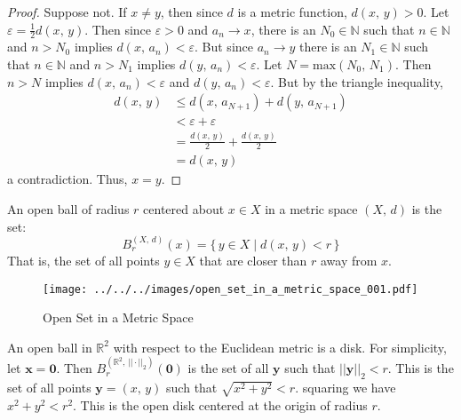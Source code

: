 \documentclass{article}
\theoremstyle{plain}
\theoremstyle{normal}
\newenvironment{example}{%
    \pushQED{\qed}\renewcommand{\qedsymbol}{$\blacksquare$}\examplex%
}{%
    \popQED\endexamplex%
}
\newenvironment{definition}{%
    \pushQED{\qed}\renewcommand{\qedsymbol}{$\blacksquare$}\definitionx%
}{%
    \popQED\enddefinitionx%
}
\begin{document}
        \begin{proof}
            Suppose not. If $x\ne{y}$, then since $d$ is a metric function,
            $d(x,\,y)>0$. Let $\varepsilon=\frac{1}{2}d(x,\,y)$. Then since
            $\varepsilon>0$ and $a_{n}\rightarrow{x}$, there is an
            $N_{0}\in\mathbb{N}$ such that $n\in\mathbb{N}$ and $n>N_{0}$
            implies $d(x,\,a_{n})<\varepsilon$. But since $a_{n}\rightarrow{y}$
            there is an $N_{1}\in\mathbb{N}$ such that $n\in\mathbb{N}$ and
            $n>N_{1}$ implies $d(y,\,a_{n})<\varepsilon$. Let
            $N=\textrm{max}(N_{0},\,N_{1})$. Then $n>N$ implies
            $d(x,\,a_{n})<\varepsilon$ and $d(y,\,a_{n})<\varepsilon$. But by
            the triangle inequality,
            \begin{align}
                d(x,\,y)&\leq{d}(x,\,a_{N+1})+d(y,\,a_{N+1})\\
                &<\varepsilon+\varepsilon\\
                &=\frac{d(x,\,y)}{2}+\frac{d(x,\,y)}{2}\\
                &=d(x,\,y)
            \end{align}
            a contradiction. Thus, $x=y$.
        \end{proof}
        \begin{definition}[\textbf{Open Ball}]
            An open ball of radius $r$ centered about $x\in{X}$ in a metric
            space $(X,\,d)$ is the set:
            \begin{equation}
                B_{r}^{(X,\,d)}(x)=\{\,y\in{X}\;|\;d(x,\,y)<r\,\}
            \end{equation}
            That is, the set of all points $y\in{X}$ that are closer than
            $r$ away from $x$.
        \end{definition}
        \begin{figure}
            \centering
            \texttt{[image: ../../../images/open\_set\_in\_a\_metric\_space\_001.pdf]}
            \caption{Open Set in a Metric Space}
            \label{fig:open_set_in_a_metric_space_001}
        \end{figure}
        \begin{example}
            An open ball in $\mathbb{R}^{2}$ with respect to the Euclidean
            metric is a disk. For simplicity, let $\mathbf{x}=\mathbf{0}$. Then
            $B_{r}^{(\mathbb{R}^{2},\,||\cdot||_{2})}(\mathbf{0})$ is
            the set of all $\mathbf{y}$ such that
            $||\mathbf{y}||_{2}<r$. This is the set of all points
            $\mathbf{y}=(x,\,y)$ such that $\sqrt{x^{2}+y^{2}}<r$. squaring
            we have $x^{2}+y^{2}<r^{2}$. This is the open disk centered at the
            origin of radius $r$.
        \end{example}
\end{document}
